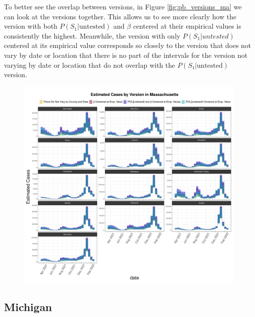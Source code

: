 \documentclass[12pt,twoside]{smiththesis}
\begin{document}
To better see the overlap between versions, in Figure \ref{fig:pb_versions_ma} we can look at the versions together. This allows us to see more clearly how the version with both \(P(S_1|\text{untested})\) and \(\beta\) centered at their empirical values is consistently the highest. Meanwhile, the version with only \(P(S_1|untested)\) centered at its empirical value corresponds so closely to the version that does not vary by date or location that there is no part of the intervals for the version not varying by date or location that do not overlap with the \(P(S_1|\text{untested})\) version.
\begin{figure}
\includegraphics[width=0.95\linewidth]{figure/ma_pb_compare_versions} \caption{\label{fig:pb_versions_ma}}\label{fig:unnamed-chunk-3}
\end{figure}
\hypertarget{michigan}{%
\subsection{Michigan}\label{michigan}}
\end{document}
